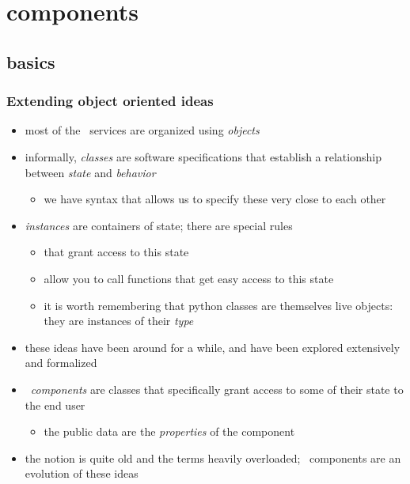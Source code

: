%
%

\section{components}
\subsection{basics}

\begin{frame}
%
  \frametitle{Extending object oriented ideas}
%
  \begin{itemize}
%
  \item most of the \pyre\ services are organized using \emph{objects}
%
  \item informally, \emph{classes} are software specifications that establish a relationship
    between \emph{state} and \emph{behavior}
    \begin{itemize}
    \item we have syntax that allows us to specify these very close to each other
    \end{itemize}
%
  \item \emph{instances} are containers of state; there are special rules
    \begin{itemize}
    \item that grant access to this state
    \item allow you to call functions that get easy access to this state
    \item it is worth remembering that python classes are themselves live objects: they
      are instances of their \emph{type}
    \end{itemize}
%
  \item these ideas have been around for a while\supercite{dahl-66,eiffel}, and have been
    explored extensively and formalized\supercite{meyer-97}
%
  \item \pyre\ \emph{components} are classes that specifically grant access to some of their
    state to the end user
    \begin{itemize}
    \item the public data are the \emph{properties} of the component
    \end{itemize}
%
  \item the notion is quite old\supercite{mcilroy-69} and the terms heavily overloaded; \pyre\
    components are an evolution of these ideas
%
  \end{itemize}
%
\end{frame}

